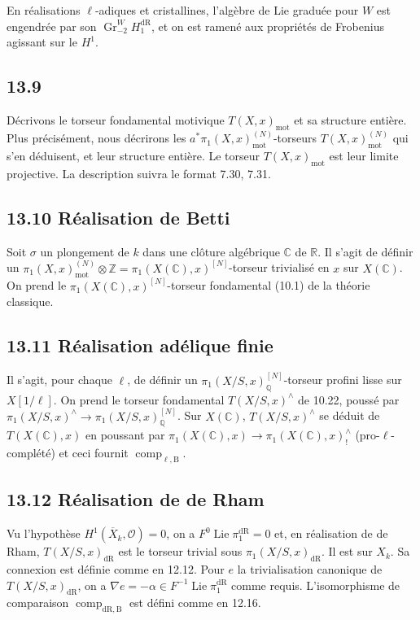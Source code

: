 \documentclass[12pt,a4paper]{article}
\theoremstyle{plain}
\theoremstyle{definition}
\theoremstyle{remark}
\DeclareMathOperator{\Gr}{Gr}
\DeclareMathOperator{\Lie}{Lie}
\DeclareMathOperator{\comp}{comp}
\newcommand{\cO}{\mathcal{O}}
\newcommand{\bZ}{\mathbb{Z}}
\newcommand{\bQ}{\mathbb{Q}}
\newcommand{\bR}{\mathbb{R}}
\newcommand{\bC}{\mathbb{C}}
\newcommand{\dr}{\mathrm{dR}}
\newcommand{\B}{\mathrm{B}}
\newcommand{\mot}{\mathrm{mot}}
\begin{document}
En réalisations $\ell$-adiques et cristallines, l'algèbre de Lie graduée pour $W$ est engendrée par son $\Gr_{-2}^W H_1^{\dr}$, et on est ramené aux propriétés de Frobenius agissant sur le $H^1$.

\subsection*{13.9}

Décrivons le torseur fondamental motivique $T(X,x)_{\mot}$ et sa structure entière. Plus précisément, nous décrirons les $a^*\pi_1(X,x)_{\mot}^{(N)}$-torseurs $T(X,x)_{\mot}^{(N)}$ qui s'en déduisent, et leur structure entière. Le torseur $T(X,x)_{\mot}$ est leur limite projective. La description suivra le format 7.30, 7.31.

\subsection*{13.10 Réalisation de Betti}

Soit $\sigma$ un plongement de $k$ dans une clôture algébrique $\bC$ de $\bR$. Il s'agit de définir un $\pi_1(X,x)_{\mot}^{(N)} \otimes \bZ = \pi_1(X(\bC),x)^{[N]}$-torseur trivialisé en $x$ sur $X(\bC)$. On prend le $\pi_1(X(\bC), x)^{[N]}$-torseur fondamental (10.1) de la théorie classique.

\subsection*{13.11 Réalisation adélique finie}

Il s'agit, pour chaque $\ell$, de définir un $\pi_1(X/S, x)_{\bQ}^{[N]}$-torseur profini lisse sur $X[1/\ell]$. On prend le torseur fondamental $T(X/S, x)^\wedge$ de 10.22, poussé par $\pi_1(X/S, x)^\wedge \to \pi_1(X/S, x)_{\bQ}^{[N]}$. Sur $X(\bC)$, $T(X/S, x)^\wedge$ se déduit de $T(X(\bC), x)$ en poussant par $\pi_1(X(\bC), x) \to \pi_1(X(\bC), x)_{!}^\wedge$ (pro-$\ell$-complété) et ceci fournit $\comp_{\ell,\B}$.

\subsection*{13.12 Réalisation de de Rham}

Vu l'hypothèse $H^1(\overline{X}_k, \cO) = 0$, on a $F^0 \Lie \pi_1^{\dr} = 0$ et, en réalisation de de Rham, $T(X/S, x)_{\dr}$ est le torseur trivial sous $\pi_1(X/S, x)_{\dr}$. Il est sur $X_k$. Sa connexion est définie comme en 12.12. Pour $e$ la trivialisation canonique de $T(X/S, x)_{\dr}$, on a $\nabla e = -\alpha \in F^{-1} \Lie \pi_1^{\dr}$ comme requis. L'isomorphisme de comparaison $\comp_{\dr,\B}$ est défini comme en 12.16.
\end{document}
